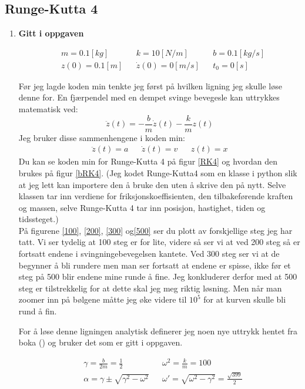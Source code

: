 \documentclass[a4paper,12pt,norsk]{article}
\begin{document}
\subsection{Runge-Kutta 4}
\begin{enumerate}[label=(\alph*)]
\item 
\begin{center}
\textbf{Gitt i oppgaven}
\end{center}
\begin{align*}
&m = 0.1[kg] && k = 10[N/m] &&b = 0.1 [kg/s]\\
& z(0) = 0.1 [m] && \dot{z}(0) = 0 [m/s] && t_0 = 0[s]
\end{align*}

Før jeg lagde koden min tenkte jeg først på hvilken ligning jeg skulle løse denne for. En fjærpendel med en dempet svinge bevegesle kan uttrykkes matematisk ved:
\begin{equation}
\ddot{z}(t) = -\frac{b}{m}\dot{z}(t) - \frac{k}{m}z(t)
\label{harm}
\end{equation}
Jeg bruker disse sammenhengene i koden min:
\begin{align*}
\ddot{z}(t) = a && \dot{z}(t) = v && z(t) = x
\end{align*}
Du kan se koden min for Runge-Kutta 4 på figur \vref{RK4} og hvordan den brukes på figur \vref{bRK4}. (Jeg kodet Runge-Kutta4 som en klasse i python slik at jeg lett kan importere den å bruke den uten å skrive den på nytt. Selve klassen tar inn verdiene for friksjonskoeffisienten, den tilbakeførende kraften og massen, selve Runge-Kutta 4 tar inn posisjon, hastighet, tiden og tidssteget.) \\
På figurene \ref{100}, \ref{200}, \ref{300} og\vref{500} ser du plott av forskjellige steg jeg har tatt. Vi ser tydelig at 100 steg er for lite, videre så ser vi at ved 200 steg så er fortsatt endene i svingningebevegelsen kantete. Ved 300 steg ser vi at de begynner å bli rundere men man ser fortsatt at endene er spisse, ikke før et steg  på 500 blir endene mine runde å fine. Jeg konkluderer derfor med at 500 steg er tilstrekkelig for at dette skal jeg meg riktig løsning. Men når man zoomer inn på bølgene måtte jeg øke videre til $10^{5}$ for at kurven skulle bli rund å fin.

For å løse denne ligningen analytisk definerer jeg noen nye uttrykk hentet fra boka (\cite{vistnes16}) og bruker det som er gitt i oppgaven.

\begin{align*}
&\gamma = \frac{b}{2m} = \frac{1}{2}&& \omega^2 = \frac{k}{m} = 100\\
&\alpha = \gamma\pm\sqrt{\gamma^2 - \omega^2} && \omega' = \sqrt{\omega^2-\gamma^2} = \frac{\sqrt{399}}{2}
\end{align*}


\end{enumerate}
\end{document}
